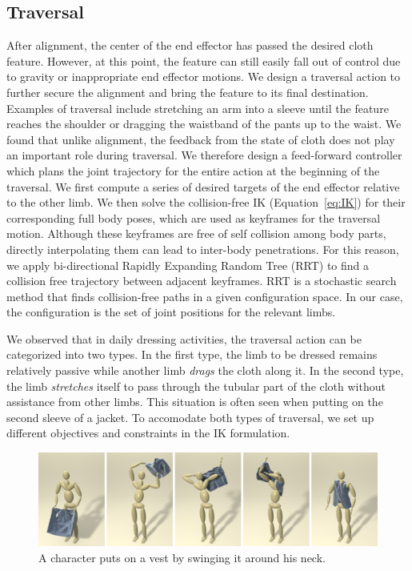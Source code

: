 \subsection{Traversal}
After alignment, the center of the end effector has passed the desired cloth feature. However, at this point, the feature can still easily fall out of control due to gravity or inappropriate end effector motions. We design a traversal action to further secure the alignment and bring the feature to its final destination. Examples of traversal include stretching an arm into a sleeve until the feature reaches the shoulder or dragging the waistband of the pants up to the waist.   We found that unlike alignment, the feedback from the state of cloth does not play an important role during traversal. We therefore design a feed-forward controller which plans the joint trajectory for the entire action at the beginning of the traversal. We first compute a series of desired targets of the end effector relative to the other limb. We then solve the collision-free IK (Equation~\ref{eq:IK}) for their corresponding full body poses, which are used as keyframes for the traversal motion. Although these keyframes are free of self collision among body parts, directly interpolating them can lead to inter-body penetrations. For this reason, we apply bi-directional Rapidly Expanding Random Tree (RRT) \cite{LaValleK:2001} to find a collision free trajectory between adjacent keyframes. RRT is a stochastic search method that finds collision-free paths in a given configuration space. In our case, the configuration is the set of joint positions for the relevant limbs.

We observed that in daily dressing activities, the traversal action can be categorized into two types. In the first type, the limb to be dressed remains relatively passive while another limb \emph{drags} the cloth along it. In the second type, the limb \emph{stretches} itself to pass through the tubular part of the cloth without assistance from other limbs. This situation is often seen when putting on the second sleeve of a jacket. To accomodate both types of traversal, we set up different objectives and constraints in the IK formulation.


\begin{figure}[!t]
  \centering
  \includegraphics[width=\textwidth]{images/vest}
  \caption{A character puts on a vest by swinging it around his neck.}
  \label{fig:vest}
\end{figure}


